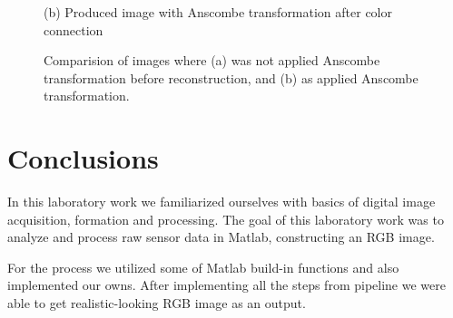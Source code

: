\documentclass[12pt,a4paper,english
]{tunithesis}
\begin{document}
\begin{figure}[h]
\begin{minipage}[b]{0.45\textwidth}
    \caption*{(b) Produced image with Anscombe transformation after color connection}
  \end{minipage}
  \caption{Comparision of images where (a) was not applied Anscombe transformation before reconstruction, and (b) as applied Anscombe transformation.}
  \label{fig:comparison-white-balance}
\end{figure}


\chapter{Conclusions}
\label{ch:conclusions}
In this laboratory work we familiarized ourselves with basics of digital image acquisition, formation and processing. The goal of this laboratory work was to analyze and process raw sensor data in Matlab, constructing an RGB image.

For the process we utilized some of Matlab build-in functions and also implemented our owns.  After implementing all the steps from pipeline we were able to get realistic-looking RGB image as an output.

%
%
\newpage

\printbibliography[title=References]
\end{document}
